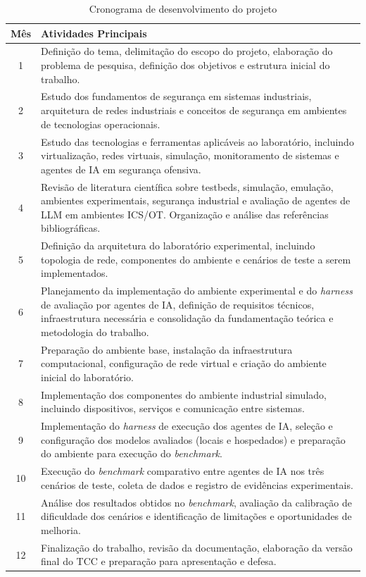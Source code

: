 \documentclass[conference]{IEEEtran}
\begin{document}
\begin{table}[h]
\centering
\caption{Cronograma de desenvolvimento do projeto}
\label{tab:cronograma} 
\begin{tabularx}{\textwidth}{|c|X|}
\hline
\textbf{Mês} & \textbf{Atividades Principais} \\
\hline
1 & Definição do tema, delimitação do escopo do projeto, elaboração do problema de pesquisa, definição dos objetivos e estrutura inicial do trabalho. \\
\hline
2 & Estudo dos fundamentos de segurança em sistemas industriais, arquitetura de redes industriais e conceitos de segurança em ambientes de tecnologias operacionais. \\
\hline
3 & Estudo das tecnologias e ferramentas aplicáveis ao laboratório, incluindo virtualização, redes virtuais, simulação, monitoramento de sistemas e agentes de IA em segurança ofensiva. \\
\hline
4 & Revisão de literatura científica sobre testbeds, simulação, emulação, ambientes experimentais, segurança industrial e avaliação de agentes de LLM em ambientes ICS/OT. Organização e análise das referências bibliográficas. \\
\hline
5 & Definição da arquitetura do laboratório experimental, incluindo topologia de rede, componentes do ambiente e cenários de teste a serem implementados. \\
\hline
6 & Planejamento da implementação do ambiente experimental e do \textit{harness} de avaliação por agentes de IA, definição de requisitos técnicos, infraestrutura necessária e consolidação da fundamentação teórica e metodologia do trabalho. \\
\hline
7 & Preparação do ambiente base, instalação da infraestrutura computacional, configuração de rede virtual e criação do ambiente inicial do laboratório. \\
\hline
8 & Implementação dos componentes do ambiente industrial simulado, incluindo dispositivos, serviços e comunicação entre sistemas. \\
\hline
9 & Implementação do \textit{harness} de execução dos agentes de IA, seleção e configuração dos modelos avaliados (locais e hospedados) e preparação do ambiente para execução do \textit{benchmark}. \\
\hline
10 & Execução do \textit{benchmark} comparativo entre agentes de IA nos três cenários de teste, coleta de dados e registro de evidências experimentais. \\
\hline
11 & Análise dos resultados obtidos no \textit{benchmark}, avaliação da calibração de dificuldade dos cenários e identificação de limitações e oportunidades de melhoria. \\
\hline
12 & Finalização do trabalho, revisão da documentação, elaboração da versão final do TCC e preparação para apresentação e defesa. \\
\hline
\end{tabularx}
\end{table}
\end{document}
